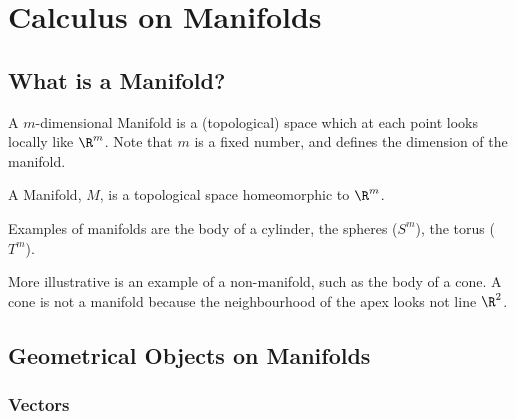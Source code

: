 



\chapter{Calculus on Manifolds}

\section{What is a Manifold?}

A $m$-dimensional {\sc Manifold} is a (topological) space which at each point looks locally like $\R^m$. Note that $m$ is a fixed number, and defines the dimension of the manifold.

\begin{Def}[Manifold]
  A {\sc Manifold}, $M$, is a topological space homeomorphic to $\R^m$.
\end{Def}

Examples of manifolds are  the body of a cylinder,  the spheres ($S^m$), the torus ($T^m$).

More illustrative is an example of a non-manifold, such as the body of a cone. A cone is not a manifold because the neighbourhood of the apex looks not line $\R^2$.

\section{Geometrical Objects on Manifolds}

\subsection{Vectors}


